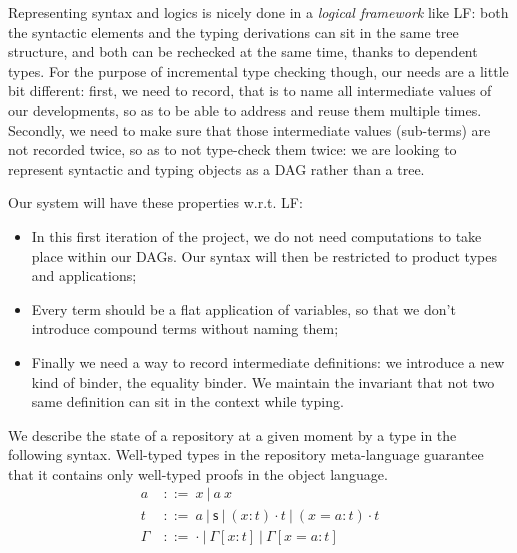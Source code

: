 \documentclass{article}
\newcommand{\sort}{\textsf{s}}
\newcommand{\gor}{\ |\ }
\newcommand{\gdecl}[2]{{#1}\ &::=\ {#2}}
\begin{document}
Representing syntax and logics is nicely done in a \emph{logical
  framework} like LF: both the syntactic
elements and the typing derivations can sit in the same tree
structure, and both can be rechecked at the same time, thanks to
dependent types. For the purpose of incremental type checking though,
our needs are a little bit different: first, we need to record, that
is to name all intermediate values of our developments, so as to be
able to address and reuse them multiple times. Secondly, we need to
make sure that those intermediate values (sub-terms) are not recorded
twice, so as to not type-check them twice: we are looking to represent
syntactic and typing objects as a DAG rather than a tree.

Our system will have these properties w.r.t. LF:
\begin{itemize}
\item In this first iteration of the project, we do not need
  computations to take place within our DAGs. Our syntax will then be
  restricted to product types and applications;
\item Every term should be a flat application of variables, so that we
  don't introduce compound terms without naming them;
\item Finally we need a way to record intermediate definitions: we
  introduce a new kind of binder, the equality binder. We maintain the
  invariant that not two same definition can sit in the context while
  typing.
\end{itemize}

We describe the state of a repository at a given moment by a type in
the following syntax. Well-typed types in the repository meta-language
guarantee that it contains only well-typed proofs in the object
language.
\begin{align*}
 \gdecl{a}{x \gor a\ x } \\
 \gdecl{t}{a \gor \sort \gor (x:t)\cdot t \gor (x=a:t)\cdot t} \\
 \gdecl{\Gamma}{\cdot \gor \Gamma[x:t] \gor \Gamma[x=a:t]}
\end{align*}


\end{document}
